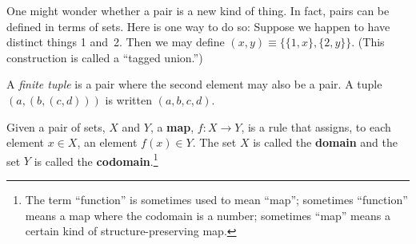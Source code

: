 \documentclass[10pt, a4paper, twocolumn]{article}
\newcommand{\defn}[1]{\textbf{#1}}
\begin{document}
One might wonder whether a pair is a new kind of thing. In fact, pairs can be
defined in terms of sets. Here is one way to do so: Suppose we happen to have
distinct things 1 and~2. Then we may define $(x, y) \equiv \{\{1, x\}, \{2,
y\}\}$. (This construction is called a “tagged union.”)

A \emph{finite tuple} is a pair where the second element may also be a pair. A
tuple $(a, (b, (c, d)))$ is written $(a, b, c, d)$. 



Given a pair of sets, $X$ and $Y$, a \defn{map}, $f : X \to Y$, is a rule that
assigns, to each element $x \in X$, an element $f(x) \in Y$. The set $X$ is called
the \defn{domain} and the set $Y$ is called the \defn{codomain}.\footnote{The
  term “function” is sometimes used to mean “map”; sometimes “function” means a
  map where the codomain is a number; sometimes “map” means a certain kind of
  structure-preserving map.}
\end{document}
